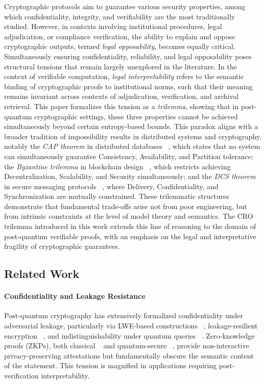 \documentclass[preprint,12pt]{elsarticle}
\begin{document}
            Cryptographic protocols aim to guarantee various security properties, among which confidentiality, integrity, and verifiability are the most traditionally studied. However, in contexts involving institutional procedures, legal adjudication, or compliance verification, the ability to explain and oppose cryptographic outputs, termed \emph{legal opposability}, becomes equally critical. Simultaneously ensuring confidentiality, reliability, and legal opposability poses structural tensions that remain largely unexplored in the literature. 
            In the context of verifiable computation, \emph{legal interpretability} refers to the semantic binding of cryptographic proofs to institutional norms, such that their meaning remains invariant across contexts of adjudication, verification, and archival retrieval.
            This paper formalizes this tension as a \emph{trilemma}, showing that in post-quantum cryptographic settings, these three properties cannot be achieved simultaneously beyond certain entropy-based bounds.
            This paradox aligns with a broader tradition of impossibility results in distributed systems and cryptography, notably the \emph{CAP theorem} in distributed databases ~\cite{brewer2000towards}, which states that no system can simultaneously guarantee Consistency, Availability, and Partition tolerance; the \emph{Byzantine trilemma} in blockchain design ~\cite{Buterin2018}, which restricts achieving Decentralization, Scalability, and Security simultaneously; and the \emph{DCS theorem} in secure messaging protocols ~\cite{dcs2020}, where Delivery, Confidentiality, and Synchronization are mutually constrained. These trilemmatic structures demonstrate that fundamental trade-offs arise not from poor engineering, but from intrinsic constraints at the level of model theory and semantics. The CRO trilemma introduced in this work extends this line of reasoning to the domain of post-quantum verifiable proofs, with an emphasis on the legal and interpretative fragility of cryptographic guarantees.
                  
        \subsection{Related Work}

            \paragraph{Confidentiality and Leakage Resistance}  
            Post-quantum cryptography has extensively formalized confidentiality under adversarial leakage, particularly via LWE-based constructions ~\cite{Regev2009}, leakage-resilient encryption ~\cite{Dziembowski2008}, and indistinguishability under quantum queries ~\cite{BonehZhandry2013}. Zero-knowledge proofs (ZKPs), both classical ~\cite{GoldreichOren1994} and quantum-secure ~\cite{Watrous2009, Unruh2012}, provide non-interactive privacy-preserving attestations but fundamentally obscure the semantic content of the statement. This tension is magnified in applications requiring post-verification interpretability.
\end{document}

